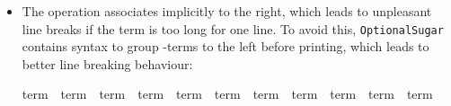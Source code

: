 \begin{isabellebody}
\begin{isamarkuptext}
\begin{itemize}
\item The  operation associates implicitly to the right,
which leads to unpleasant line breaks if the term is too long for one
line. To avoid this, \texttt{OptionalSugar} contains syntax to group
-terms to the left before printing, which leads to better
line breaking behaviour:
\begin{isabelle}%
term\ \isacharat\ term\ \isacharat\ term\ \isacharat\ term\ \isacharat\ term\ \isacharat\ term\ \isacharat\ term\ \isacharat\ term\ \isacharat\ term\ \isacharat\ term\ \isacharat\ term%
\end{isabelle}


\end{itemize}
\end{isamarkuptext}
\end{isabellebody}
